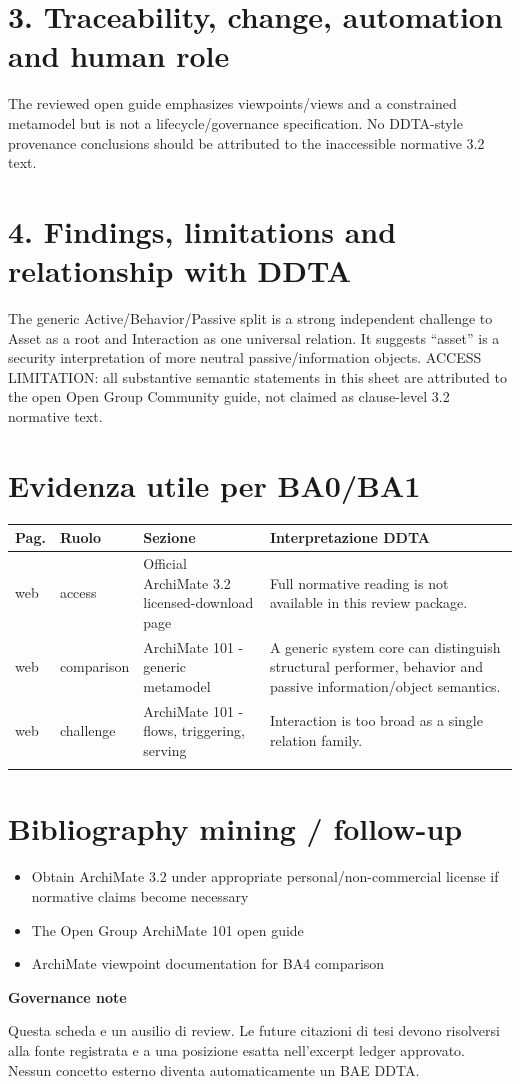 \documentclass[10pt,a4paper]{article}
\newenvironment{challenge}[1]{\def\FrameCommand{\fcolorbox{ddtaorange}{ddtagray}}\MakeFramed{\advance\hsize-2\width\FrameRestore}\noindent\textbf{#1}\par\smallskip}{\endMakeFramed}
\begin{document}
\section{3. Traceability, change, automation and human role}
The reviewed open guide emphasizes viewpoints/views and a constrained metamodel but is not a lifecycle/governance specification. No DDTA-style provenance conclusions should be attributed to the inaccessible normative 3.2 text.
\section{4. Findings, limitations and relationship with DDTA}
The generic Active/Behavior/Passive split is a strong independent challenge to Asset as a root and Interaction as one universal relation. It suggests “asset” is a security interpretation of more neutral passive/information objects. ACCESS LIMITATION: all substantive semantic statements in this sheet are attributed to the open Open Group Community guide, not claimed as clause-level 3.2 normative text.
\section{Evidenza utile per BA0/BA1}
\begin{longtable}{p{1.2cm}p{2.0cm}p{4.0cm}p{8.0cm}}
\toprule
Pag. & Ruolo & Sezione & Interpretazione DDTA\\
\midrule
\endhead
web & access & Official ArchiMate 3.2 licensed-download page & Full normative reading is not available in this review package.\\
\addlinespace[.3em]
web & comparison & ArchiMate 101 - generic metamodel & A generic system core can distinguish structural performer, behavior and passive information/object semantics.\\
\addlinespace[.3em]
web & challenge & ArchiMate 101 - flows, triggering, serving & Interaction is too broad as a single relation family.\\
\addlinespace[.3em]
\bottomrule
\end{longtable}
\section{Bibliography mining / follow-up}
\begin{itemize}
\item Obtain ArchiMate 3.2 under appropriate personal/non-commercial license if normative claims become necessary
\item The Open Group ArchiMate 101 open guide
\item ArchiMate viewpoint documentation for BA4 comparison
\end{itemize}
\begin{challenge}{Governance note}
Questa scheda e un ausilio di review. Le future citazioni di tesi devono risolversi alla fonte registrata e a una posizione esatta nell'excerpt ledger approvato. Nessun concetto esterno diventa automaticamente un BAE DDTA.
\end{challenge}
\end{document}
